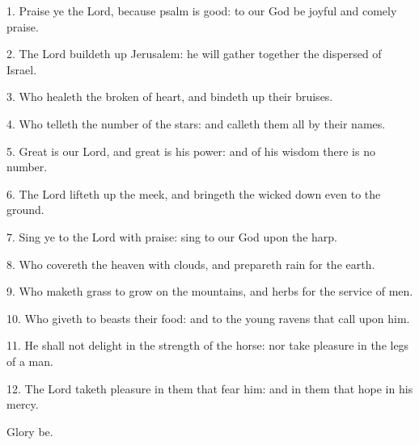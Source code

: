 1. Praise ye the Lord, because psalm is good: to our God be joyful and comely praise.

2. The Lord buildeth up Jerusalem: he will gather together the dispersed of Israel.

3. Who healeth the broken of heart, and bindeth up their bruises.

4. Who telleth the number of the stars: and calleth them all by their names.

5. Great is our Lord, and great is his power: and of his wisdom there is no number.

6. The Lord lifteth up the meek, and bringeth the wicked down even to the ground.

7. Sing ye to the Lord with praise: sing to our God upon the harp.

8. Who covereth the heaven with clouds, and prepareth rain for the earth.

9. Who maketh grass to grow on the mountains, and herbs for the service of men.

10. Who giveth to beasts their food: and to the young ravens that call upon him.

11. He shall not delight in the strength of the horse: nor take pleasure in the legs of a man.

12. The Lord taketh pleasure in them that fear him: and in them that hope in his mercy. 

Glory be.